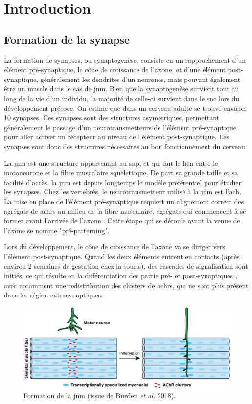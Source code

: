 \chapter{Introduction}

\section{Formation de la synapse}
	\label{sec:IntroSynapse}
	La formation de synapses, ou synaptogenèse, consiste en un rapprochement d'un élément pré-synaptique, le cône de croissance de l'axone, et d'une élément post-synaptique, généralement les dendrites d'un neurones, mais pouvant également être un muscle dans le cas de \gls{jnm}. Bien que la synaptogenèse survient tout au long de la vie d'un individu, la majorité de celle-ci survient dans le \gls{snc} lors du développement précoce. On estime que dans un cerveau adulte se trouve environ 10	synapses. Ces synapses sont des structures asymétriques, permettant généralement le passage d'un neurotransmetteurs de l'élément pré-synaptique pour aller activer un récepteur au niveau de l'élément post-synaptique. Les synapses sont donc des structures nécessaires au bon fonctionnement du cerveau. 
	
	La \gls{jnm} est une structure appartenant au \gls{snp}, et qui fait le lien entre le motoneurone et la fibre musculaire squelettique. De part sa grande taille et sa facilité d'accès, la \gls{jnm} est depuis longtemps le modèle préférentiel pour étudier les synapses. Chez les vertébrés, le neurotransmetteur utilisé à la \gls{jnm} est l'\gls{ach}. La mise en place de l'élément pré-synaptique requiert un alignement correct des agrégats de \glspl{achr} au milieu de la fibre musculaire, agrégats qui commencent à se former avant l'arrivée de l'axone \cite{Wu2010a, Gordon2012}. Cette étape qui se déroule avant la venue de l'axone se nomme "pré-patterning".
	
	Lors du développement, le cône de croissance de l'axone va se diriger vers l'élément post-synaptique. Quand les deux éléments entrent en contacts (après environ 2 semaines de gestation chez la souris), des cascades de signalisation sont initiés, ce qui résulte en la différentiation des partie pré- et post-synaptiques \cite{Sanes1999}, avec notamment une redistribution des clusters de \glspl{achr}, qui ne sont plus présent dans les région extrasynaptiques.
	
	\begin{figure}
		\includegraphics[width=\textwidth]{./Images/formation_jnm.png}
		\caption{Formation de la \gls{jnm} (issue de Burden \emph{et al.} 2018).}
		\label{fig:FormaJNM}
	\end{figure}
	\clearpage
	
